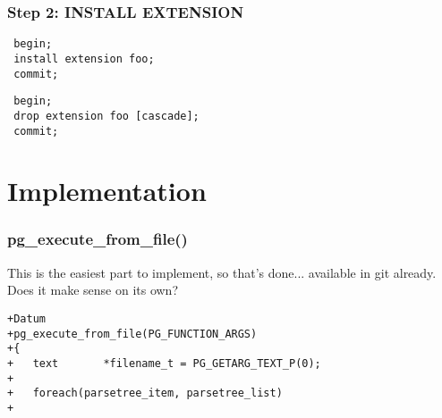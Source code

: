 \documentclass[english]{beamer}
\begin{document}
\begin{frame}[fragile]
  \frametitle{Step 2: INSTALL EXTENSION}

\begin{example}
\begin{verbatim}
 begin;
 install extension foo;
 commit;
\end{verbatim}
\end{example}

\begin{example}
\begin{verbatim}
 begin;
 drop extension foo [cascade];
 commit;
\end{verbatim}
\end{example}
\end{frame}

\section{Implementation}
\begin{frame}[fragile]
  \frametitle{pg\_execute\_from\_file()}

  This is the easiest part to implement, so that's done... available in git
  already. Does it make sense on its own?

\begin{example}
\begin{verbatim}
+Datum
+pg_execute_from_file(PG_FUNCTION_ARGS)
+{
+	text	   *filename_t = PG_GETARG_TEXT_P(0);
+
+	foreach(parsetree_item, parsetree_list)
+
\end{verbatim}
\end{example}
\end{frame}


\end{document}

